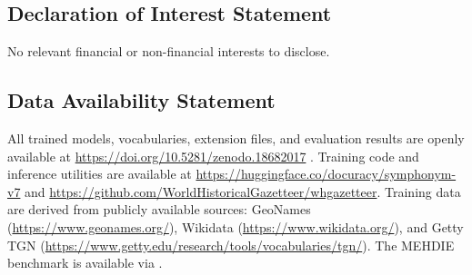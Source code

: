 \documentclass[11pt,a4paper]{article}
\begin{document}
\subsection*{Declaration of Interest Statement}

No relevant financial or non-financial interests to disclose.

\subsection*{Data Availability Statement}

All trained models, vocabularies, extension files, and evaluation results are openly available at \url{https://doi.org/10.5281/zenodo.18682017} \citep{symphonym2026zenodo}. Training code and inference utilities are available at \url{https://huggingface.co/docuracy/symphonym-v7} \citep{symphonym2026hf} and \url{https://github.com/WorldHistoricalGazetteer/whgazetteer}. Training data are derived from publicly available sources: GeoNames (\url{https://www.geonames.org/}), Wikidata (\url{https://www.wikidata.org/}), and Getty TGN (\url{https://www.getty.edu/research/tools/vocabularies/tgn/}). The MEHDIE benchmark is available via \citet{mehdie2025}.







\clearpage
\end{document}
